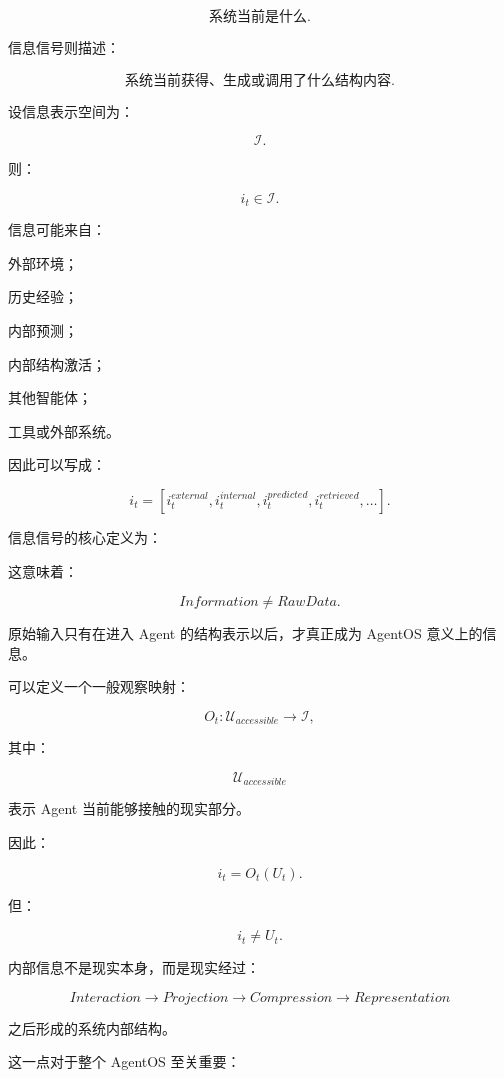 \[
\text{系统当前是什么}.
\]

信息信号则描述：

\[
\text{系统当前获得、生成或调用了什么结构内容}.
\]

设信息表示空间为：

\[
\mathcal I.
\]

则：

\[
i_t\in\mathcal I.
\]

信息可能来自：

外部环境；

历史经验；

内部预测；

内部结构激活；

其他智能体；

工具或外部系统。

因此可以写成：

\[
i_t
=
[
i_t^{external},
i_t^{internal},
i_t^{predicted},
i_t^{retrieved},
\ldots
].
\]

信息信号的核心定义为：

\begin{statementbox}
\centering
{}
\end{statementbox}

这意味着：

\[
Information
\neq
RawData.
\]

原始输入只有在进入 Agent 的结构表示以后，才真正成为 AgentOS 意义上的信息。

可以定义一个一般观察映射：

\[
O_t:
\mathcal U_{accessible}
\rightarrow
\mathcal I,
\]

其中：

\[
\mathcal U_{accessible}
\]

表示 Agent 当前能够接触的现实部分。

因此：

\[
i_t
=
O_t(U_t).
\]

但：

\[
\boxed{
i_t\neq U_t.
}
\]

内部信息不是现实本身，而是现实经过：

\[
Interaction
\rightarrow
Projection
\rightarrow
Compression
\rightarrow
Representation
\]

之后形成的系统内部结构。

这一点对于整个 AgentOS 至关重要：

\begin{statementbox}
\centering
{}
\end{statementbox}

